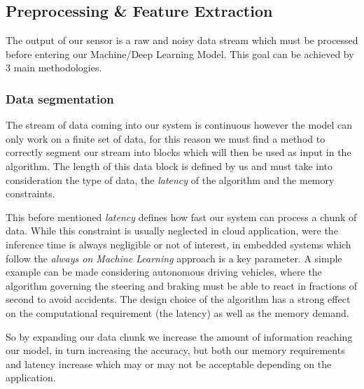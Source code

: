 \documentclass{article}
\begin{document}
    \subsection{Preprocessing \& Feature Extraction}
      The output of our sensor is a raw and noisy data stream which must be processed before entering our Machine/Deep Learning Model. This goal can be achieved by 3 main methodologies.
      \subsubsection{Data segmentation}
        The stream of data coming into our system is continuous however the model can only work on a finite set of data, for this reason we must find a method to correctly segment our stream into blocks
        which will then be used as input in the algorithm. The length of this data block is defined by us and must take into consideration the type of data, the \emph{latency} of the algorithm and the memory constraints.

        This before mentioned \emph{latency} defines how fast our system can process a chunk of data. While this constraint is usually neglected in cloud application, were the inference time is always negligible or not of interest, in embedded systems which follow the
        \emph{always on Machine Learning} approach is a key parameter. A simple example can be made considering autonomous driving vehicles, where the algorithm governing the steering and braking must be able to react in fractions of second to avoid accidents. The design choice 
        of the algorithm has a strong effect on the computational requirement (the latency) as well as the memory demand.

        So by expanding our data chunk we increase the amount of information reaching our model, in turn increasing the accuracy, but both our memory requirements and latency increase which may or may not be acceptable depending on the application.
\end{document}
